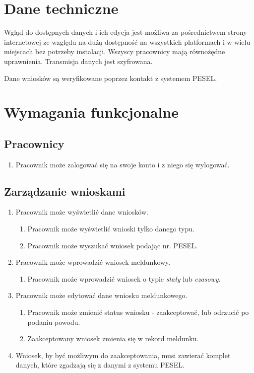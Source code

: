 \documentclass[12pt]{article}
\begin{document}
\section{Dane techniczne}
Wgląd do dostępnych danych i ich edycja jest możliwa za pośrednictwem strony internetowej ze względu na dużą dostępność na wszystkich platformach i w wielu miejscach bez potrzeby instalacji. Wszyscy pracownicy mają równożędne uprawnienia. Transmisja danych jest szyfrowana.

Dane wniosków są weryfikowane poprzez kontakt z systemem PESEL.
\section{Wymagania funkcjonalne}

\subsection{Pracownicy}
\begin{enumerate}
    \item Pracownik może zalogować się na swoje konto i z niego się wylogować.
\end{enumerate}
\subsection{Zarządzanie wnioskami}
\begin{enumerate}
    \item Pracownik może wyświetlić dane wniosków.
    \begin{enumerate}
        \item Pracownik może wyświetlić wnioski tylko danego typu.
        \item Pracownik może wyszukać wniosek podając nr. PESEL.
    \end{enumerate}
    \item Pracownik może wprowadzić wniosek meldunkowy.
    \begin{enumerate}
        \item Pracownik może wprowadzić wniosek o typie \textit{stały} lub \textit{czasowy}.
    \end{enumerate}
    \item Pracownik może edytować dane wniosku meldunkowego.
    \begin{enumerate}
        \item Pracownik może zmienić status wniosku - zaakceptować, lub odrzucić po podaniu powodu.
        \item Zaakceptowany wniosek zmienia się w rekord meldunku.
    \end{enumerate}
    \item Wniosek, by być możliwym do zaakceptowania, musi zawierać komplet danych, które zgadzają się z danymi z systemu PESEL.
\end{enumerate}
\end{document}
